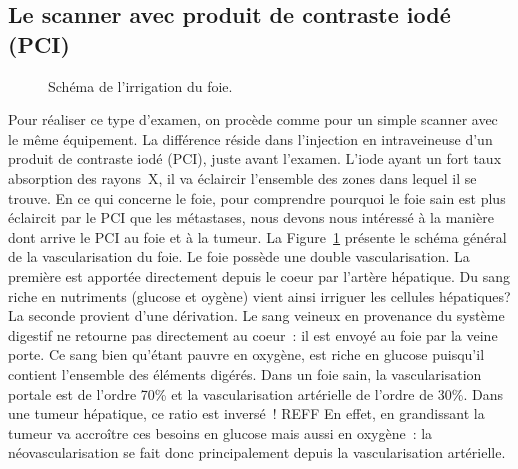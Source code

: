 \documentclass[main.tex]{subfiles}
\begin{document}
\subsection{Le scanner avec produit de contraste iodé (PCI)}
\begin{figure}[h]

\vspace{-10mm}
\caption{\label{fig:schema_irrig_foie} Schéma de l'irrigation du foie.}
\end{figure}

Pour réaliser ce type d'examen, on procède comme pour un simple scanner avec le même équipement. La différence réside dans l'injection en intraveineuse d'un produit de contraste iodé (PCI), juste avant l'examen. L'iode ayant un fort taux absorption  des rayons~X, il va éclaircir l'ensemble des zones dans lequel il se trouve. En ce qui concerne le foie, pour comprendre pourquoi le foie sain est plus éclaircit par le PCI que les métastases, nous devons nous intéressé à la manière dont arrive le PCI au foie et à la tumeur. La Figure~\ref{fig:schema_irrig_foie} présente le schéma général de la vascularisation du foie. Le foie possède une double vascularisation. La première est apportée directement depuis le coeur par l'artère hépatique. Du sang riche en nutriments (glucose et oygène) vient ainsi irriguer les cellules hépatiques? La seconde provient d'une dérivation. Le sang veineux en provenance du système digestif ne retourne pas directement au coeur~: il est envoyé au foie par la veine porte. Ce sang bien qu'étant pauvre en oxygène, est riche en glucose puisqu'il contient l'ensemble des éléments digérés. Dans un foie sain, la vascularisation portale est de l'ordre 70\% et la vascularisation artérielle de l'ordre de 30\%. Dans une tumeur hépatique, ce ratio est inversé~! REFF En effet, en grandissant la tumeur va accroître ces besoins en glucose mais aussi en oxygène~: la néovascularisation se fait donc principalement depuis la vascularisation artérielle. 
\end{document}
